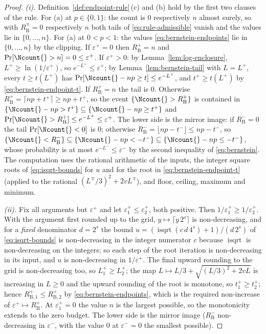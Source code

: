 \begin{proof}
\emph{(i).} Definition~\ref{def:endpoint-rule}\,(c) and (b) hold by the
first two clauses of the rule. For (a) at $p\in\{0,1\}$: the count is $0$
respectively $n$ almost surely, so with $R^{\mp}_{\mathrm{B}}=0$
respectively $n$ both tails of \eqref{eq:rule-admissible} vanish and the
values lie in $\{0,\dots,n\}$. For (a) at $0<p<1$: the values
\eqref{eq:bernstein-endpoints} lie in $\{0,\dots,n\}$ by the clipping. If
$\varepsilon^{+}=0$ then $R^{+}_{\mathrm{B}}=n$ and
$\Pr[\Ncount{}>n]=0\le\varepsilon^{+}$. If $\varepsilon^{+}>0$: by
Lemma~\ref{lem:log-enclosure}, $L^{+}\ge\ln(1/\varepsilon^{+})$, so
$e^{-L^{+}}\le\varepsilon^{+}$; by Lemma~\ref{lem:bernstein-tail} with
$L=L^{+}$, every $t\ge t(L^{+})$ has $\Pr[\Ncount{}-np\ge t]\le e^{-L^{+}}$,
and $t^{+}\ge t(L^{+})$ by \eqref{eq:bernstein-endpoint-t}. If
$R^{+}_{\mathrm{B}}=n$ the tail is $0$. Otherwise
$R^{+}_{\mathrm{B}}=\lceil np+t^{+}\rceil\ge np+t^{+}$, so the event
$\{\Ncount{}>R^{+}_{\mathrm{B}}\}$ is contained in
$\{\Ncount{}-np>t^{+}\}\subseteq\{\Ncount{}-np\ge t^{+}\}$ and
$\Pr[\Ncount{}>R^{+}_{\mathrm{B}}]\le e^{-L^{+}}\le\varepsilon^{+}$. The
lower side is the mirror image: if $R^{-}_{\mathrm{B}}=0$ the tail
$\Pr[\Ncount{}<0]$ is $0$; otherwise
$R^{-}_{\mathrm{B}}=\lfloor np-t^{-}\rfloor\le np-t^{-}$, so
$\{\Ncount{}<R^{-}_{\mathrm{B}}\}\subseteq\{\Ncount{}-np<-t^{-}\}
\subseteq\{\Ncount{}-np\le-t^{-}\}$, whose probability is at most
$e^{-L^{-}}\le\varepsilon^{-}$ by the second inequality of
\eqref{eq:bernstein}. The computation uses the rational arithmetic of the
inputs, the integer square roots of \eqref{eq:isqrt-bounds} for $u$ and for
the root in \eqref{eq:bernstein-endpoint-t} (applied to the rational
$(L^{\mp}/3)^{2}+2vL^{\mp}$), and floor, ceiling, maximum and minimum.

\emph{(ii).} Fix all arguments but $\varepsilon^{+}$ and let
$\varepsilon^{+}_1\le\varepsilon^{+}_2$, both positive. Then
$1/\varepsilon^{+}_1\ge1/\varepsilon^{+}_2$. With the argument first
rounded up to the grid, $y\mapsto\lceil y\,2^{s}\rceil$ is non-decreasing,
and for a \emph{fixed} denominator $d=2^{s}$ the bound
$u=(\operatorname{isqrt}(c\,d\,4^{s})+1)/(d\,2^{s})$ of
\eqref{eq:isqrt-bounds} is non-decreasing in the integer numerator $c$
because $\operatorname{isqrt}$ is non-decreasing on the integers; so each
step of the root iteration is non-decreasing in its input, and $u$ is
non-decreasing in $1/\varepsilon^{+}$. The final upward rounding to the
grid is non-decreasing too, so $L^{+}_1\ge L^{+}_2$; the map
$L\mapsto L/3+\sqrt{(L/3)^{2}+2vL}$ is increasing in $L\ge0$ and the upward
rounding of the root is monotone, so $t^{+}_1\ge t^{+}_2$; hence
$R^{+}_{\mathrm{B},1}\le R^{+}_{\mathrm{B},2}$ by
\eqref{eq:bernstein-endpoints}, which is the required non-increase of
$\varepsilon^{+}\mapsto R^{+}_{\mathrm{B}}$. At $\varepsilon^{+}_1=0$ the
value $n$ is the largest possible, so the monotonicity extends to the zero
budget. The lower side is the mirror image ($R^{-}_{\mathrm{B}}$
non-decreasing in $\varepsilon^{-}$, with the value $0$ at
$\varepsilon^{-}=0$ the smallest possible).


\end{proof}
